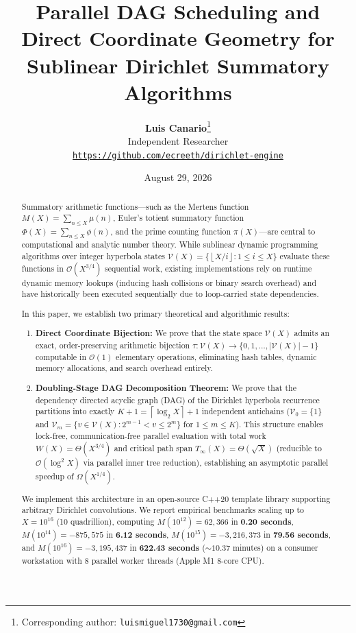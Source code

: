 \documentclass[11pt,a4paper]{article}
\title{\textbf{Parallel DAG Scheduling and Direct Coordinate Geometry for Sublinear Dirichlet Summatory Algorithms}}
\author{
    \textbf{Luis Canario}\thanks{Corresponding author: \texttt{luismiguel1730@gmail.com}} \\
    Independent Researcher \\
    \texttt{\small \href{https://github.com/ecreeth/dirichlet-engine}{https://github.com/ecreeth/dirichlet-engine}}
}
\date{August 29, 2026}
\theoremstyle{plain}
\theoremstyle{definition}
\newcommand{\V}{\mathcal{V}}
\newcommand{\Oh}{\mathcal{O}}
\newcommand{\floor}[1]{\left\lfloor #1 \right\rfloor}
\newcommand{\ceil}[1]{\left\lceil #1 \right\rceil}
\begin{document}
\maketitle

\begin{abstract}
Summatory arithmetic functions---such as the Mertens function $M(X) = \sum_{n \le X} \mu(n)$, Euler's totient summatory function $\Phi(X) = \sum_{n \le X} \phi(n)$, and the prime counting function $\pi(X)$---are central to computational and analytic number theory. While sublinear dynamic programming algorithms over integer hyperbola states $\V(X) = \{\floor{X/i} : 1 \le i \le X\}$ evaluate these functions in $\Oh(X^{3/4})$ sequential work, existing implementations rely on runtime dynamic memory lookups (inducing hash collisions or binary search overhead) and have historically been executed sequentially due to loop-carried state dependencies.

In this paper, we establish two primary theoretical and algorithmic results:
\begin{enumerate}
    \item \textbf{Direct Coordinate Bijection:} We prove that the state space $\V(X)$ admits an exact, order-preserving arithmetic bijection $\tau: \V(X) \to \{0, 1, \dots, |\V(X)|-1\}$ computable in $\Oh(1)$ elementary operations, eliminating hash tables, dynamic memory allocations, and search overhead entirely.
    \item \textbf{Doubling-Stage DAG Decomposition Theorem:} We prove that the dependency directed acyclic graph (DAG) of the Dirichlet hyperbola recurrence partitions into exactly $K + 1 = \ceil{\log_2 X} + 1$ independent antichains ($\V_0 = \{1\}$ and $\V_m = \{v \in \V(X) : 2^{m-1} < v \le 2^m\}$ for $1 \le m \le K$). This structure enables lock-free, communication-free parallel evaluation with total work $W(X) = \Theta(X^{3/4})$ and critical path span $T_\infty(X) = \Theta(\sqrt{X})$ (reducible to $\Oh(\log^2 X)$ via parallel inner tree reduction), establishing an asymptotic parallel speedup of $\Omega(X^{1/4})$.
\end{enumerate}
We implement this architecture in an open-source C++20 template library supporting arbitrary Dirichlet convolutions. We report empirical benchmarks scaling up to $X = 10^{16}$ (10 quadrillion), computing $M(10^{12}) = 62,366$ in \textbf{0.20 seconds}, $M(10^{14}) = -875,575$ in \textbf{6.12 seconds}, $M(10^{15}) = -3,216,373$ in \textbf{79.56 seconds}, and $M(10^{16}) = -3,195,437$ in \textbf{622.43 seconds} ($\sim 10.37$ minutes) on a consumer workstation with 8 parallel worker threads (Apple M1 8-core CPU).
\end{abstract}
\end{document}

